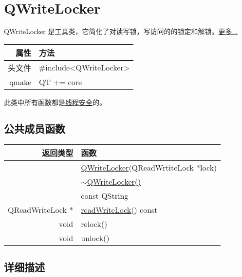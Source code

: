 \chapter{QWriteLocker}

QWriteLocker 是工具类，它简化了对读写锁，写访问的的锁定和解锁。\href{https://github.com/QtDocumentCN/QtDocumentCN/blob/master/Src/W/QWriteLocker/QWriteLocker.md#%E8%AF%A6%E7%BB%86%E6%8F%8F%E8%BF%B0}{更多...}


\begin{tabular}{|r|l|}
	\hline
	属性 & 方法 \\
	\hline
	头文件 & \#include<QWriteLocker>\\      
	\hline
	qmake & QT += core\\      
	\hline
\end{tabular}


\begin{notice}
此类中所有函数都是\href{https://github.com/QtDocumentCN/QtDocumentCN/blob/master/Src/R/Reentrancy_and_Thread-Safety/Reentrancy_and_Thread-Safety.md}{线程安全}的。

\end{notice}

\section{公共成员函数}

\begin{tabular}{|r|l|}
	\hline
	返回类型 & 函数 \\
	\hline
	&	\href{https://github.com/QtDocumentCN/QtDocumentCN/blob/master/Src/W/QWriteLocker/QWriteLocker.md#qwritelockerqwritelockerqreadwritelock-lock}{QWriteLocker}(QReadWrtiteLock *lock) \\
	\hline
	& \href{https://github.com/QtDocumentCN/QtDocumentCN/blob/master/Src/W/QWriteLocker/QWriteLocker.md#qwritelockerqwritelocker}{$\sim$QWriteLocker()} \\
	\hline
		&const QString\\
	\hline
	QReadWriteLock *	&\href{https://github.com/QtDocumentCN/QtDocumentCN/blob/master/Src/W/QWriteLocker/QWriteLocker.md#qreadwritelock-qwritelockerreadwritelock-const}{readWriteLock()}  const\\
	\hline
	void&	relock()\\
	\hline
	void &	unlock()\\
	\hline
\end{tabular}


\section{详细描述}


